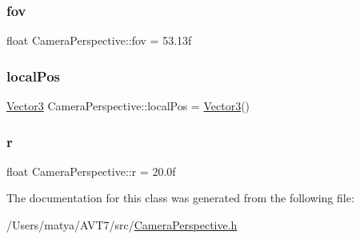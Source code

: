 \subsubsection{\texorpdfstring{fov}{fov}}
{\footnotesize\ttfamily float Camera\+Perspective\+::fov = 53.\+13f}

\mbox{\label{class_camera_perspective_afe2ca37c029acb558350b2fe1025e9c5}} 
\subsubsection{\texorpdfstring{local\+Pos}{localPos}}
{\footnotesize\ttfamily \hyperlink{class_vector3}{Vector3} Camera\+Perspective\+::local\+Pos = \hyperlink{class_vector3}{Vector3}()}

\mbox{\label{class_camera_perspective_adb49aa14a62f537f810038351b141a36}} 
\subsubsection{\texorpdfstring{r}{r}}
{\footnotesize\ttfamily float Camera\+Perspective\+::r = 20.\+0f}



The documentation for this class was generated from the following file\+:\begin{DoxyCompactItemize}
\item 
/\+Users/matya/\+A\+V\+T7/src/\hyperlink{_camera_perspective_8h}{Camera\+Perspective.\+h}\end{DoxyCompactItemize}
